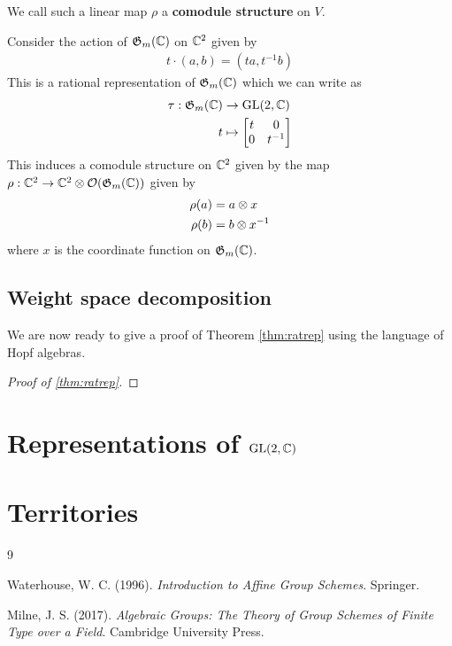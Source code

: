 \documentclass[12pt]{article}
\begin{document}
\begin{definition}
    We call such a linear map $\rho$ a \textbf{comodule structure} on $V$.
\end{definition}

\begin{example}
    Consider the action of $\mathfrak{G}_m(\mathbb{C})$ on $\mathbb{C}^2$ given by
    \begin{align*}
        t\cdot (a,b) = (ta, t^{-1}b)
    \end{align*} This is a rational representation of $\mathfrak{G}_m(\mathbb{C})$ which we can write as 
    \begin{align*}
        \tau:\mathfrak{G}_m(\mathbb{C}) &\to \operatorname{GL}(2,\mathbb{C}) \\
        t &\mapsto \begin{bmatrix}
            t & 0 \\
            0 & {t}^{-1}
        \end{bmatrix}
    \end{align*} This induces a comodule structure on $\mathbb{C}^2$ given by the map $\rho: \mathbb{C}^2\to \mathbb{C}^2\otimes \mathcal{O}(\mathfrak{G}_m(\mathbb{C}))$ given by
    \begin{align*}
        \rho(a) &= a\otimes x \\
        \rho(b) &= b\otimes {x}^{-1}
    \end{align*} where $x$ is the coordinate function on $\mathfrak{G}_m(\mathbb{C})$.
\end{example}

\subsection{Weight space decomposition}
We are now ready to give a proof of Theorem \ref{thm:ratrep} using the language of Hopf algebras.
\begin{proof}
    [Proof of \ref{thm:ratrep}]
\end{proof}

\section{Representations of $\operatorname{GL}(2,\mathbb{C})$}
\section{Territories}

\begin{thebibliography}{9}

Waterhouse, W. C. (1996). \textit{Introduction to Affine Group Schemes}. Springer.

Milne, J. S. (2017). \textit{Algebraic Groups: The Theory of Group Schemes of Finite Type over a Field}. Cambridge University Press.

\end{thebibliography}
\end{document}
